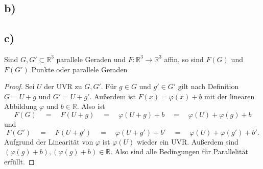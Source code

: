 \documentclass{article}
\newcommand{\RR}{\mathbb{R}}
\newcommand{\eq}{\mathbb{\quad = \quad}}
\begin{document}
\newpage

\subsection*{b)}
\vfill


\subsection*{c)}
Sind $G,G' \subset \RR^3$ parallele Geraden
und $F: \RR^3 \to \RR^3$ affin,
so sind $F(G)$ und $F(G')$
Punkte oder parallele Geraden


\begin{proof}
  Sei $U$ der UVR zu $G,G'$.
  Für $g \in G$ und $g' \in G'$ gilt nach Definition
  $G = U + g$ und $G' = U + g'$.
  Außerdem ist $F(x) = \varphi(x) + b$ mit der linearen Abbildung
  $\varphi$ und $b \in \RR$.
  Also ist
  \[
    F(G) \eq F(U + g) \eq \varphi(U + g) + b
    \eq \varphi(U) + \varphi(g) + b
  \]
  und
  \[
    F(G') \eq F(U + g') \eq \varphi(U + g') + b'
    \eq \varphi(U) + \varphi(g') + b'.
  \]
  Aufgrund der Linearität von $\varphi$ ist
  $\varphi(U)$ wieder ein UVR.
  Außerdem sind
  $(\varphi(g) + b), (\varphi(g) + b) \in \RR$.
  Also sind alle Bedingungen für Parallelität erfüllt.
\end{proof}
\end{document}

